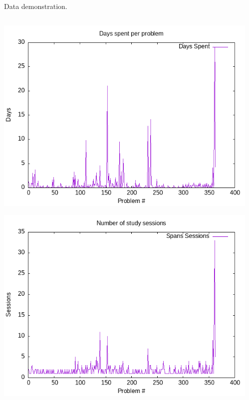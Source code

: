 \documentclass[presentation, CJK, compress,aspectratio=169]{beamer}
\begin{document}
\begin{frame}[label={sec:org0761ff9},shrink=30]{Data demonstration.}
\begin{columns}[t]
\begin{column}{0.5\columnwidth}
\begin{center}
\includegraphics[width=.9\linewidth]{experience-report-days.png}
\end{center}
\begin{center}
\includegraphics[width=.9\linewidth]{experience-report-study-sessions.png}
\end{center}
\end{column}
\begin{column}{0.5\columnwidth}
\begin{center}

\end{center}
\end{column}
\end{columns}
\end{frame}
\end{document}
